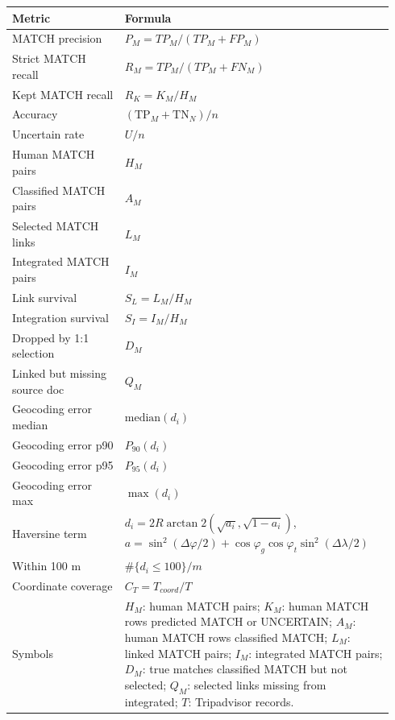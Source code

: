 \begin{tabular}{p{0.28\linewidth}p{0.66\linewidth}}
\toprule
Metric & Formula \\
\midrule
MATCH precision & $P_M=TP_M/(TP_M+FP_M)$ \\
Strict MATCH recall & $R_M=TP_M/(TP_M+FN_M)$ \\
Kept MATCH recall & $R_K=K_M/H_M$ \\
Accuracy & $(\mathrm{TP}_{M}+\mathrm{TN}_{N})/n$ \\
Uncertain rate & $U/n$ \\
Human MATCH pairs & $H_M$ \\
Classified MATCH pairs & $A_M$ \\
Selected MATCH links & $L_M$ \\
Integrated MATCH pairs & $I_M$ \\
Link survival & $S_L=L_M/H_M$ \\
Integration survival & $S_I=I_M/H_M$ \\
Dropped by 1:1 selection & $D_M$ \\
Linked but missing source doc & $Q_M$ \\
Geocoding error median & $\mathrm{median}(d_i)$ \\
Geocoding error p90 & $P_{90}(d_i)$ \\
Geocoding error p95 & $P_{95}(d_i)$ \\
Geocoding error max & $\max(d_i)$ \\
Haversine term & $d_i=2R\arctan2(\sqrt{a_i},\sqrt{1-a_i})$, $a=\sin^2(\Delta\varphi/2)+\cos\varphi_g\cos\varphi_t\sin^2(\Delta\lambda/2)$ \\
Within 100 m & $\#\{d_i \leq 100\}/m$ \\
Coordinate coverage & $C_T=T_{coord}/T$ \\
\midrule
Symbols & $H_M$: human MATCH pairs; $K_M$: human MATCH rows predicted MATCH or UNCERTAIN; $A_M$: human MATCH rows classified MATCH; $L_M$: linked MATCH pairs; $I_M$: integrated MATCH pairs; $D_M$: true matches classified MATCH but not selected; $Q_M$: selected links missing from integrated; $T$: Tripadvisor records. \\
\bottomrule
\end{tabular}
